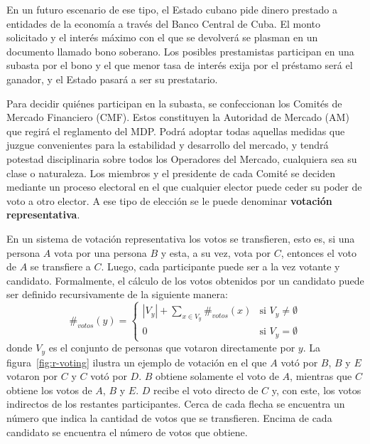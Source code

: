 En un futuro escenario de ese tipo, el Estado cubano pide dinero prestado a entidades de la econom\'ia a trav\'es del Banco Central de Cuba. El monto solicitado y el inter\'es m\'aximo con el que se devolver\'a se plasman en un documento llamado bono soberano.  Los posibles prestamistas participan en una subasta por el bono y el que menor tasa de inter\'es exija por el pr\'estamo ser\'a el ganador, y el Estado pasar\'a a ser su prestatario.  

Para decidir qui\'enes participan en la subasta, se confeccionan los Comit\'es de Mercado Financiero (CMF).  Estos constituyen la Autoridad de Mercado (AM) que regirá el reglamento del MDP. Podrá adoptar todas aquellas medidas que juzgue convenientes para la estabilidad y desarrollo del mercado, y tendrá potestad disciplinaria sobre todos los Operadores del Mercado, cualquiera sea su clase o naturaleza. Los miembros y el presidente de cada Comit\'e se deciden mediante un proceso electoral en el que cualquier elector puede ceder su poder de voto a otro elector. A ese tipo de elecci\'on se le puede denominar \textbf{votaci\'on representativa}.  


En un sistema de votaci\'on representativa  los votos se transfieren, esto es, si una persona $A$ vota por una persona $B$ y esta, a su vez, vota por  $C$, entonces el voto de $A$ se transfiere a $C$. Luego, cada participante puede ser a la vez votante y candidato. Formalmente, el c\'alculo de los votos obtenidos por un candidato puede ser definido recursivamente de la siguiente manera:
\begin{equation}\label{eq:votes-count}
    \#_{votos}(y) = \begin{cases}
        |V_y| + \underset{x \in V_y}{\sum} \#_{votos}(x) & \text{si } V_y \neq \emptyset \\
        0 & \text{si } V_y = \emptyset 
    \end{cases}
\end{equation}
donde $V_y$ es el conjunto de personas que votaron directamente por $y$. La figura~\ref{fig:r-voting} ilustra un ejemplo de votación en el que $A$ votó por $B$, $B$ y $E$ votaron por $C$ y $C$ votó por $D$. $B$ obtiene solamente el voto de $A$, mientras que $C$ obtiene los votos de $A$, $B$ y $E$. $D$ recibe el voto directo de $C$ y, con este,  los votos indirectos de los restantes participantes. Cerca de cada flecha se encuentra un n\'umero que indica la cantidad de votos que se transfieren. Encima de cada candidato se encuentra el n\'umero de votos que obtiene.

